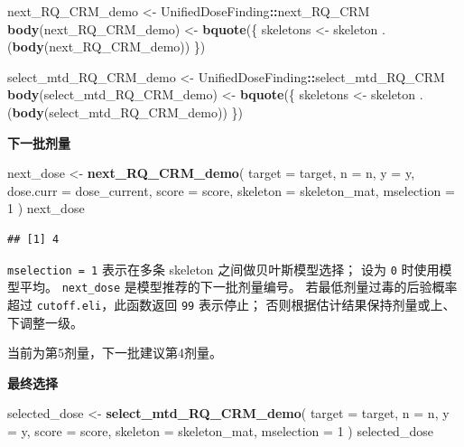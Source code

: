 \documentclass[
  chinese,
]{article}
\newenvironment{Shaded}{\begin{snugshade}}{\end{snugshade}}
\newcommand{\AttributeTok}[1]{\textcolor[rgb]{0.13,0.29,0.53}{#1}}
\newcommand{\DecValTok}[1]{\textcolor[rgb]{0.00,0.00,0.81}{#1}}
\newcommand{\FunctionTok}[1]{\textcolor[rgb]{0.13,0.29,0.53}{\textbf{#1}}}
\newcommand{\NormalTok}[1]{#1}
\newcommand{\OtherTok}[1]{\textcolor[rgb]{0.56,0.35,0.01}{#1}}
\newcommand{\SpecialCharTok}[1]{\textcolor[rgb]{0.81,0.36,0.00}{\textbf{#1}}}
\begin{document}
\begin{Shaded}
\begin{Highlighting}[]
\NormalTok{next\_RQ\_CRM\_demo }\OtherTok{\textless{}{-}}\NormalTok{ UnifiedDoseFinding}\SpecialCharTok{::}\NormalTok{next\_RQ\_CRM}
\FunctionTok{body}\NormalTok{(next\_RQ\_CRM\_demo) }\OtherTok{\textless{}{-}} \FunctionTok{bquote}\NormalTok{(\{}
\NormalTok{  skeletons }\OtherTok{\textless{}{-}}\NormalTok{ skeleton}
\NormalTok{  .(}\FunctionTok{body}\NormalTok{(next\_RQ\_CRM\_demo))}
\NormalTok{\})}

\NormalTok{select\_mtd\_RQ\_CRM\_demo }\OtherTok{\textless{}{-}}\NormalTok{ UnifiedDoseFinding}\SpecialCharTok{::}\NormalTok{select\_mtd\_RQ\_CRM}
\FunctionTok{body}\NormalTok{(select\_mtd\_RQ\_CRM\_demo) }\OtherTok{\textless{}{-}} \FunctionTok{bquote}\NormalTok{(\{}
\NormalTok{  skeletons }\OtherTok{\textless{}{-}}\NormalTok{ skeleton}
\NormalTok{  .(}\FunctionTok{body}\NormalTok{(select\_mtd\_RQ\_CRM\_demo))}
\NormalTok{\})}
\end{Highlighting}
\end{Shaded}

\textbf{下一批剂量}

\begin{Shaded}
\begin{Highlighting}[]
\NormalTok{next\_dose }\OtherTok{\textless{}{-}} \FunctionTok{next\_RQ\_CRM\_demo}\NormalTok{(}
  \AttributeTok{target =}\NormalTok{ target, }\AttributeTok{n =}\NormalTok{ n, }\AttributeTok{y =}\NormalTok{ y, }\AttributeTok{dose.curr =}\NormalTok{ dose\_current,}
  \AttributeTok{score =}\NormalTok{ score, }\AttributeTok{skeleton =}\NormalTok{ skeleton\_mat, }\AttributeTok{mselection =} \DecValTok{1}
\NormalTok{)}
\NormalTok{next\_dose}
\end{Highlighting}
\end{Shaded}

\begin{verbatim}
## [1] 4
\end{verbatim}

\texttt{mselection\ =\ 1} 表示在多条 skeleton 之间做贝叶斯模型选择；
设为 \texttt{0} 时使用模型平均。 \texttt{next\_dose}
是模型推荐的下一批剂量编号。 若最低剂量过毒的后验概率超过
\texttt{cutoff.eli}，此函数返回 \texttt{99} 表示停止；
否则根据估计结果保持剂量或上、下调整一级。

当前为第5剂量，下一批建议第4剂量。

\textbf{最终选择}

\begin{Shaded}
\begin{Highlighting}[]
\NormalTok{selected\_dose }\OtherTok{\textless{}{-}} \FunctionTok{select\_mtd\_RQ\_CRM\_demo}\NormalTok{(}
  \AttributeTok{target =}\NormalTok{ target, }\AttributeTok{n =}\NormalTok{ n, }\AttributeTok{y =}\NormalTok{ y, }\AttributeTok{score =}\NormalTok{ score,}
  \AttributeTok{skeleton =}\NormalTok{ skeleton\_mat, }\AttributeTok{mselection =} \DecValTok{1}
\NormalTok{)}
\NormalTok{selected\_dose}
\end{Highlighting}
\end{Shaded}
\end{document}
